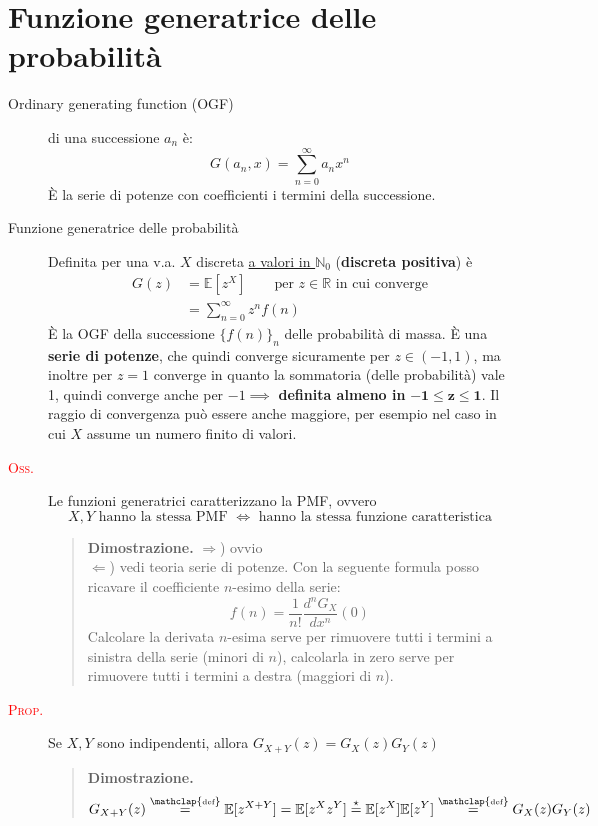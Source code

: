 \documentclass[a4paper,10pt]{article}
\newcommand{\myth}{\normalfont \scshape \textcolor{red}} %
\newcommand{\re}{\mathbb{R}} %
\newcommand{\ex}{\mathbb{E}} %
\newcommand{\myeq}[1]{\stackrel{\mathclap{\normalfont\mbox{\tiny{#1}}}}{=}} %
\theoremstyle{remark}
\theoremstyle{definition}
\newenvironment{dimo}{\begin{quote}\textbf{Dimostrazione.}}{\end{quote}} %
\begin{document}
\section*{Funzione generatrice delle probabilità}
\begin{description}
\item[Ordinary generating function (OGF)] di una successione $a_n$ è: $$G(a_n,x)=\sum_{n=0}^\infty a_nx^n$$
È la serie di potenze con coefficienti i termini della successione.
    \item[Funzione generatrice delle probabilità] Definita per una v.a. $X$ discreta \underline{a valori in $\mathbb{N}_0$} (\textbf{discreta positiva}) è 
    \begin{align*}
    G(z) &= \ex[z^X] \quad \quad \text{per $z\in \re$ in cui converge} \\
    &= \sum_{n=0}^{\infty}z^nf(n)
    \end{align*} 
  È la OGF della successione $\{f(n)\}_n$ delle probabilità di massa. È una \textbf{serie di potenze}, che quindi converge sicuramente per  $z \in (-1,1)$, ma inoltre per $z=1$ converge in quanto la sommatoria (delle probabilità) vale 1, quindi converge anche per $-1 \implies$ \textbf{definita almeno in} $\pmb{-1 \le z \le 1}$. Il raggio di convergenza può essere anche maggiore, per esempio nel caso in cui $X$ assume un numero finito di valori.

\item[\myth{Oss.}] Le funzioni  generatrici caratterizzano la PMF, ovvero \\
\begin{equation*}
    \text{$X,Y$ hanno la stessa PMF $\iff$ hanno la stessa funzione caratteristica}
\end{equation*}
\begin{dimo}
$\Rightarrow$) ovvio \\
$\Leftarrow$) vedi teoria serie di potenze. Con la  seguente formula posso ricavare il coefficiente $n$-esimo della serie:
$$f(n)=\frac{1}{n!}\frac{d^nG_X}{dx^n}(0)$$
Calcolare la derivata $n$-esima serve per rimuovere tutti i termini a sinistra della serie (minori di $n$), calcolarla in zero  serve per rimuovere tutti i termini a destra (maggiori di $n$).
\end{dimo}

\item[\myth{Prop.}] Se $X,Y$ sono indipendenti, allora $G_{X+Y}(z)=G_X(z)G_Y(z)$ 

\begin{dimo}
    $$G_{X+Y}(z) \myeq{def} \ex[z^{X+Y}] = \ex[z^Xz^Y] \overset{\star}{=} \ex[z^X]\ex[z^Y] \myeq{def} G_X(z)G_Y(z)$$


\end{dimo}
\end{description}
\end{document}
